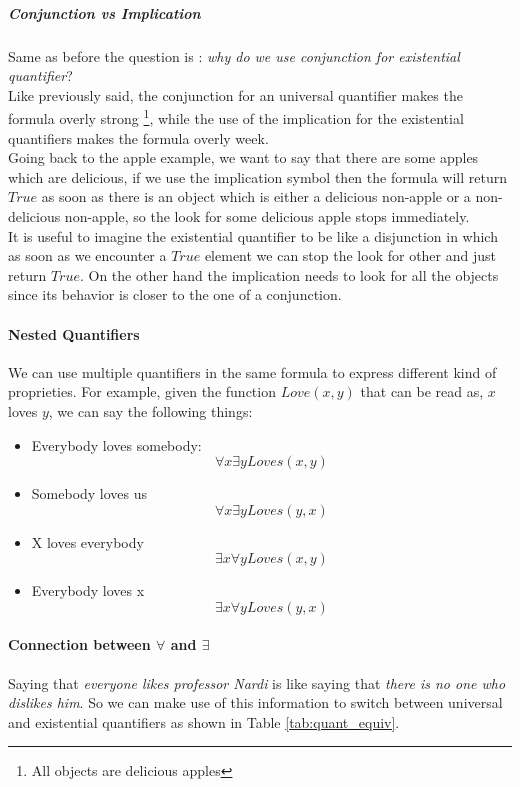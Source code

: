 \documentclass[10pt,a4paper]{article}
\begin{document}
\subparagraph{Conjunction vs Implication}
Same as before the question is : \textit{why do we use conjunction for existential quantifier}?\\
Like previously said, the conjunction for an universal quantifier makes the formula overly strong \footnote{All objects are delicious apples}, while the use of the implication for the existential quantifiers makes the formula overly week.\\
Going back to the apple example, we want to say that there are some apples which are delicious, if we use the implication symbol then the formula will return $True$ as soon as there is an object which is either a delicious non-apple or a non-delicious non-apple, so the look for some delicious apple stops immediately.\\
It is useful to imagine the existential quantifier to be like a disjunction in which as soon as we encounter a $True$ element we can stop the look for other and just return $True$.
On the other hand the implication needs to look for all the objects since its behavior is closer to the one of a conjunction.

\paragraph{Nested Quantifiers}
We can use multiple quantifiers in the same formula to express different kind of proprieties. For example, given the function $Love(x,y)$ that can be read as, $x$ loves $y$, we can say the following things:
\begin{itemize}
\item Everybody loves somebody:
\[\forall x \exists y Loves(x,y)\]
\item Somebody loves us
\[\forall x \exists y Loves(y,x)\]
\item X loves everybody
\[\exists x \forall y Loves(x,y)\]
\item Everybody loves x
\[\exists x \forall y Loves(y,x)\]
\end{itemize}


\paragraph{Connection between $\forall$ and $\exists$}
Saying that \textit{everyone likes professor Nardi} is like saying that \textit{there is no one who dislikes him}. 
So we can make use of this information to switch between universal and existential quantifiers as shown in Table \ref{tab:quant_equiv}.
\end{document}
